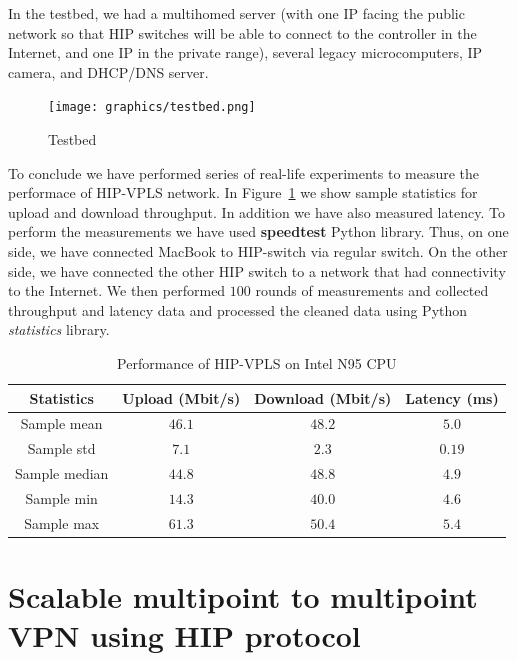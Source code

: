 In the testbed, we had a multihomed server (with one IP facing 
the public network so that HIP switches will be able to connect to 
the controller in the Internet, and one IP in the private range), 
several legacy microcomputers, IP camera, and DHCP/DNS server.

\begin{figure}[!ht]
    \centering
    \texttt{[image: graphics/testbed.png]}
    \caption{Testbed}
    \label{fig:testbed}
\end{figure}

To conclude we have performed series of real-life experiments to measure the 
performace of HIP-VPLS network. In Figure~\ref{tab:vpls-performance} we show
sample statistics for upload and download throughput. In addition we have also
measured latency. To perform the measurements we have used {\bf speedtest}
Python library. Thus, on one side, we have connected MacBook to HIP-switch via regular
switch. On the other side, we have connected the other HIP switch to a network 
that had connectivity to the Internet. We then performed $100$ rounds of measurements
and collected throughput and latency data and processed the cleaned data using Python
{\it statistics} library.

\begin{table}
    \centering
    \begin{tabular}{|c|c|c|c|}
    \hline
    Statistics     & Upload (Mbit/s)        & Download (Mbit/s)     & Latency (ms) \\\hline
    Sample mean    & $46.1$                  & $48.2$                 & $5.0$         \\
    Sample std     & $7.1$                   & $2.3$                  & $0.19$        \\
    Sample median  & $44.8$                  & $48.8$                 & $4.9$         \\
    Sample min     & $14.3$                  & $40.0$                 & $4.6$         \\
    Sample max     & $61.3$                  & $50.4$                 & $5.4$         \\
    \hline
    \end{tabular}
    \caption{Performance of HIP-VPLS on Intel N95 CPU}  
    \label{tab:vpls-performance}
\end{table}

\section{Scalable multipoint to multipoint VPN using HIP protocol}

